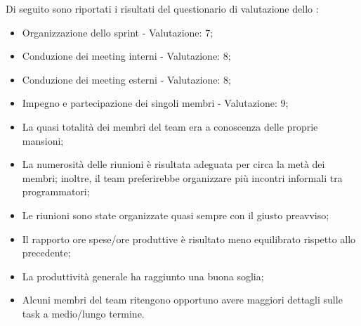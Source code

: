 \par Di seguito sono riportati i risultati del questionario di valutazione dello :
\begin{itemize}
  \item Organizzazione dello sprint - Valutazione: 7;
  \item Conduzione dei meeting interni - Valutazione: 8;
  \item Conduzione dei meeting esterni - Valutazione: 8;
  \item Impegno e partecipazione dei singoli membri - Valutazione: 9;
  \item La quasi totalità dei membri del team era a conoscenza delle proprie mansioni;
  \item La numerosità delle riunioni è risultata adeguata per circa la metà dei membri; inoltre, il team preferirebbe organizzare più incontri informali tra programmatori;
  \item Le riunioni sono state organizzate quasi sempre con il giusto preavviso;
  \item Il rapporto ore spese/ore produttive è risultato meno equilibrato rispetto allo  precedente;
  \item La produttività generale ha raggiunto una buona soglia;
  \item Alcuni membri del team ritengono opportuno avere maggiori dettagli sulle task a medio/lungo termine.
\end{itemize}

